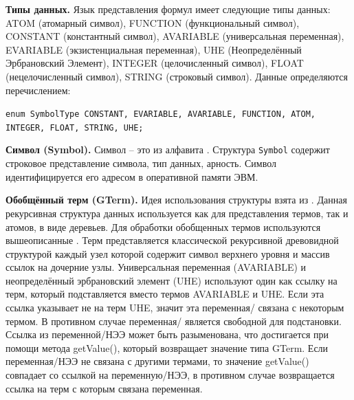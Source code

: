 \textbf{Типы данных.}  Язык представления формул имеет следующие типы данных: ATOM (атомарный символ), FUNCTION (функциональный символ), CONSTANT (константный символ), AVARIABLE (универсальная переменная), EVARIABLE (экзистенциальная переменная), UHE (Неопределённый Эрбрановский Элемент), INTEGER (целочисленный символ), FLOAT (нецелочисленный символ), STRING (строковый символ). Данные  определяются перечислением:

{\tt enum SymbolType {CONSTANT, EVARIABLE, AVARIABLE, FUNCTION, ATOM, INTEGER, FLOAT, STRING, UHE};}

\textbf{Символ (Symbol).} Символ -- это  из алфавита . Структура \texttt{Symbol} содержит строковое представление символа, тип данных, арность. Символ идентифицируется его адресом в оперативной памяти ЭВМ.

\textbf{Обобщённый терм (GTerm).} Идея использования структуры взята из \cite{NNN}. Данная рекурсивная структура данных используется как для представления термов, так и атомов, в виде деревьев. Для  обработки  обобщенных термов используются вышеописанные . Терм представляется классической рекурсивной древовидной структурой каждый узел которой содержит символ  верхнего уровня и массив ссылок на дочерние узлы. Универсальная переменная (AVARIABLE) и неопределённый эрбрановский элемент (UHE) используют один  как ссылку на терм, который подставляется вместо термов AVARIABLE и UHE. Если эта ссылка указывает не на терм UHE, значит эта переменная/ связана с некоторым термом. В противном случае переменная/ является свободной для подстановки. Ссылка из переменной/НЭЭ может быть разыменована, что достигается при помощи метода getValue(), который возвращает значение типа GTerm. Если переменная/НЭЭ не связана с другими термами, то значение getValue() совпадает со ссылкой на  переменную/НЭЭ, в противном случае возвращается ссылка на терм с которым связана переменная.

